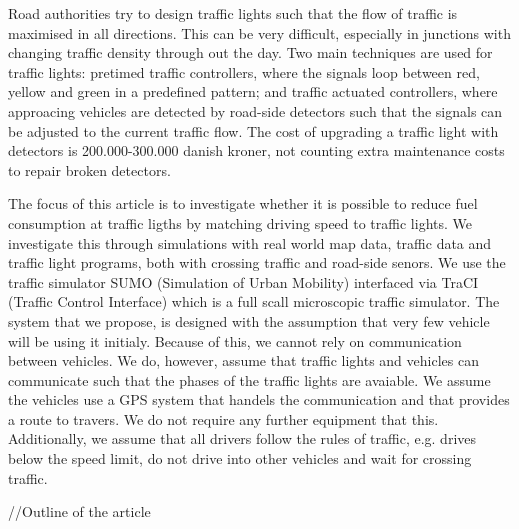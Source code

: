 

Road authorities try to design traffic lights such that the flow of traffic is maximised in all directions.
This can be very difficult, especially in junctions with changing traffic density through out the day.
Two main techniques are used for traffic lights: pretimed traffic controllers, where the signals loop between red, yellow and green in a predefined pattern; and traffic actuated controllers, where approacing vehicles are detected by road-side detectors such that the signals can be adjusted to the current traffic flow. 
The cost of upgrading a traffic light with detectors is 200.000-300.000 danish kroner, not counting extra maintenance costs to repair broken detectors\cite{Vejdir}.

The focus of this article is to investigate whether it is possible to reduce fuel consumption at traffic ligths by matching driving speed to traffic lights. 
We investigate this through simulations with real world map data, traffic data and traffic light programs, both with crossing traffic and road-side senors. %
We use the traffic simulator SUMO (Simulation of Urban Mobility)\cite{sumo} interfaced via TraCI (Traffic Control Interface)\cite{traci} which is a full scall microscopic traffic simulator.
The system that we propose, is designed with the assumption that very few vehicle will be using it initialy. 
Because of this, we cannot rely on communication between vehicles.
We do, however, assume that traffic lights and vehicles can communicate such that the phases of the traffic lights are avaiable.
We assume the vehicles use a GPS system that handels the communication and that provides a route to travers.
We do not require any further equipment that this.
Additionally, we assume that all drivers follow the rules of traffic, e.g. drives below the speed limit, do not drive into other vehicles and wait for crossing traffic.

//Outline of the article












